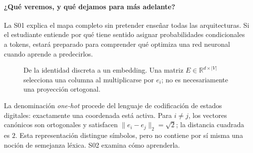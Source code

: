 \paragraph{¿Qué veremos, y qué dejamos para más adelante?}
\begin{center}
\end{center}
La S01 explica el mapa completo sin pretender enseñar todas las arquitecturas. Si el estudiante entiende por qué tiene sentido asignar probabilidades condicionales a tokens, estará preparado para comprender qué optimiza una red neuronal cuando aprende a predecirlos.





\begin{figure}[htbp]\centering
{}
\caption{De la identidad discreta a un embedding. Una matriz
$E\in\mathbb R^{d\times|V|}$ selecciona una columna al multiplicarse
por $e_i$; no es necesariamente una proyección ortogonal.}
\label{fig:c1:onehot-embedding}
\end{figure}
La denominación \emph{one-hot} procede del lenguaje de codificación de
estados digitales: exactamente una coordenada está activa. Para
$i\ne j$, los vectores canónicos son ortogonales y satisfacen
$\|e_i-e_j\|_2=\sqrt{2}$; la distancia cuadrada es $2$. Esta
representación distingue símbolos, pero no contiene por sí misma
una noción de semejanza léxica. S02 examina cómo aprenderla.



